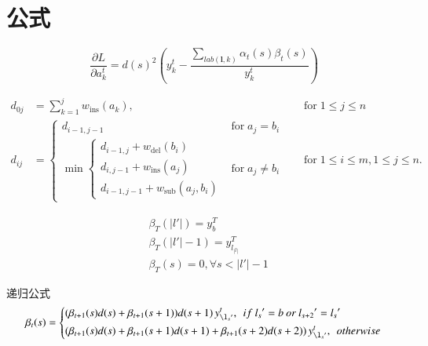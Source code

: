 \documentclass[winfonts]{njuthesis}
\begin{document}
\newpage %


\section{公式}

\begin{equation}
\frac{\partial L}{\partial a_{k}^t} = {d(s)}^2 (y_{k}^t - \frac{\sum_{lab(\mathbf{l},k)} \alpha_t(s)\beta_t(s) }{y_{k}^t} )
\end{equation}

\begin{equation}
\begin{aligned}
d_{{0j}}&=\sum _{{k=1}}^{{j}}w_{{\mathrm  {ins}}}(a_{{k}}),\quad &{\text{for}}\;1\leq j\leq n\\
d_{{ij}}&={\begin{cases}d_{{i-1,j-1}}&{\text{for}}\;a_{{j}}=b_{{i}}\\\min {\begin{cases}d_{{i-1,j}}+w_{{\mathrm  {del}}}(b_{{i}})\\d_{{i,j-1}}+w_{{\mathrm  {ins}}}(a_{{j}})\\d_{{i-1,j-1}}+w_{{\mathrm  {sub}}}(a_{{j}},b_{{i}})\end{cases}}&{\text{for}}\;a_{{j}}\neq b_{{i}}\end{cases}}\quad &{\text{for}}\;1\leq i\leq m,1\leq j\leq n.
\end{aligned}
\end{equation}

\begin{equation}
\begin{aligned}
&\beta_T(|l{}'|)=y_{b}^{T}\\
&\beta_T(|l{}'|-1)=y_{l_|l|}^{T} \\
&\beta_T(s)=0, \forall s < |l{}'|-1
\end{aligned}
\end{equation}

递归公式
\begin{equation}
\beta_t(s)=\left\{
\begin{aligned}
& (\beta_{t+1}(s) d(s)+\beta_{t+1}(s+1))d(s+1)\,  y_{\l_s{}'}^t, \: \: if \:  l_s{}'=b \:  or \:  l_{s+2}{}'=l_s{}'\\
& (\beta_{t+1}(s) d(s)+\beta_{t+1}(s+1)d(s+1)+\beta_{t+1}(s+2)d(s+2))\,  y_{\l_s{}'}^t,\: \:   otherwise
\end{aligned}
\right.
\end{equation}
\end{document}
